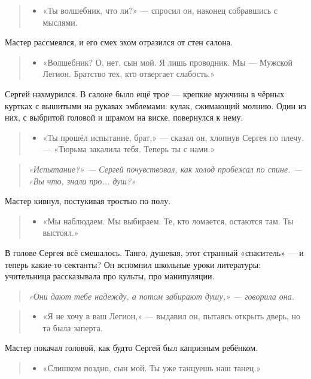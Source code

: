 \documentclass[12pt,a4paper]{book}
\newenvironment{dialogue}{\begin{quote}\itshape\begin{itemize}\item[]}{\end{itemize}\end{quote}}
\newenvironment{innerthought}{\begin{quote}\small\itshape}{\end{quote}}
\begin{document}
\begin{dialogue}
«Ты волшебник, что ли?» --- спросил он, наконец собравшись с мыслями. \\
\end{dialogue}

Мастер рассмеялся, и его смех эхом отразился от стен салона.

\begin{dialogue}
«Волшебник? О, нет, сын мой. Я лишь проводник. Мы --- Мужской Легион. Братство тех, кто отвергает слабость.»
\end{dialogue}

Сергей нахмурился. В салоне было ещё трое --- крепкие мужчины в чёрных куртках с вышитыми на рукавах эмблемами: кулак, сжимающий молнию. Один из них, с выбритой головой и шрамом на виске, повернулся к нему.

\begin{dialogue}
«Ты прошёл испытание, брат,» --- сказал он, хлопнув Сергея по плечу. --- «Тюрьма закалила тебя. Теперь ты с нами.»
\end{dialogue}

\begin{innerthought}
«Испытание?» --- Сергей почувствовал, как холод пробежал по спине. --- «Вы что, знали про... душ?»
\end{innerthought}

Мастер кивнул, постукивая тростью по полу.

\begin{dialogue}
«Мы наблюдаем. Мы выбираем. Те, кто ломается, остаются там. Ты выстоял.»
\end{dialogue}

В голове Сергея всё смешалось. Танго, душевая, этот странный «спаситель» --- и теперь какие-то сектанты? Он вспомнил школьные уроки литературы: учительница рассказывала про культы, про манипуляции.

\begin{innerthought}
«Они дают тебе надежду, а потом забирают душу,» --- говорила она.
\end{innerthought}

\begin{dialogue}
«Я не хочу в ваш Легион,» --- выдавил он, пытаясь открыть дверь, но та была заперта. \\
\end{dialogue}

Мастер покачал головой, как будто Сергей был капризным ребёнком.

\begin{dialogue}
«Слишком поздно, сын мой. Ты уже танцуешь наш танец.»
\end{dialogue}
\end{document}
